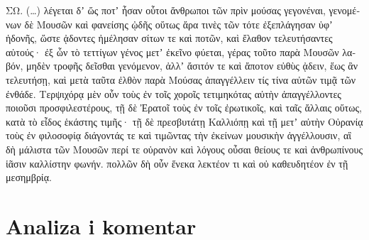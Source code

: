 {\large

\begin{greek}

\noindent ΣΩ. (\dots) λέγεται δʼ ὥς ποτʼ ἦσαν οὗτοι ἄνθρωποι τῶν πρὶν μούσας γεγονέναι, γενομένων δὲ Μουσῶν καὶ φανείσης ᾠδῆς οὕτως ἄρα τινὲς τῶν τότε ἐξεπλάγησαν ὑφʼ ἡδονῆς, ὥστε ᾀδοντες ἠμέλησαν σίτων τε καὶ ποτῶν, καὶ ἔλαθον τελευτήσαντες αὑτούς· ἐξ ὧν τὸ τεττίγων γένος μετʼ ἐκεῖνο φύεται, γέρας τοῦτο παρὰ Μουσῶν λαβόν, μηδὲν τροφῆς δεῖσθαι γενόμενον, ἀλλʼ ἄσιτόν τε καὶ ἄποτον εὐθὺς ᾀδειν, ἕως ἂν τελευτήσῃ, καὶ μετὰ ταῦτα ἐλθὸν παρὰ Μούσας ἀπαγγέλλειν τίς τίνα αὐτῶν τιμᾷ τῶν ἐνθάδε. Τερψιχόρᾳ μὲν οὖν τοὺς ἐν τοῖς χοροῖς τετιμηκότας αὐτὴν ἀπαγγέλλοντες ποιοῦσι προσφιλεστέρους, τῇ δὲ Ἐρατοῖ τοὺς ἐν τοῖς ἐρωτικοῖς, καὶ ταῖς ἄλλαις οὕτως, κατὰ τὸ εἶδος ἑκάστης τιμῆς· τῇ δὲ πρεσβυτάτῃ Καλλιόπῃ καὶ τῇ μετʼ αὐτὴν Οὐρανίᾳ τοὺς ἐν φιλοσοφίᾳ διάγοντάς τε καὶ τιμῶντας τὴν ἐκείνων μουσικὴν ἀγγέλλουσιν, αἳ δὴ μάλιστα τῶν Μουσῶν περί τε οὐρανὸν καὶ λόγους οὖσαι θείους τε καὶ ἀνθρωπίνους ἱᾶσιν καλλίστην φωνήν. πολλῶν δὴ οὖν ἕνεκα λεκτέον τι καὶ οὐ καθευδητέον ἐν τῇ μεσημβρίᾳ.
\end{greek}

}

\newpage

\section*{Analiza i komentar}


